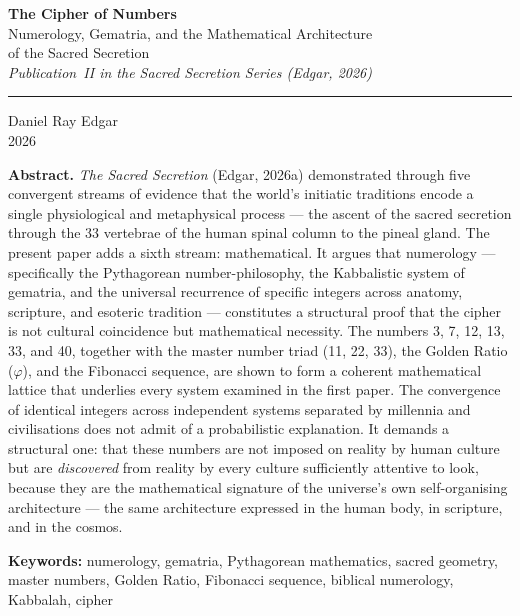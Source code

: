 \documentclass[12pt, a4paper]{article}
\begin{document}

\begin{titlepage}
  \centering
  \vspace*{2cm}

  {\LARGE\bfseries The Cipher of Numbers}\\[0.8em]
  {\large Numerology, Gematria, and the Mathematical Architecture\\
  of the Sacred Secretion}\\[0.4em]
  {\normalsize\itshape Publication~II in the Sacred Secretion Series
  (Edgar, 2026)}

  \vspace{2cm}
  \rule{0.5\linewidth}{0.5pt}
  \vspace{2cm}

  {\large Daniel Ray Edgar}\\[0.4em]
  {\normalsize 2026}

  \vfill

  \noindent\textbf{Abstract.}\quad
  \emph{The Sacred Secretion} (Edgar, 2026a) demonstrated through five
  convergent streams of evidence that the world's initiatic traditions encode
  a single physiological and metaphysical process — the ascent of the sacred
  secretion through the 33 vertebrae of the human spinal column to the pineal
  gland. The present paper adds a sixth stream: mathematical. It argues that
  numerology — specifically the Pythagorean number-philosophy, the Kabbalistic
  system of gematria, and the universal recurrence of specific integers across
  anatomy, scripture, and esoteric tradition — constitutes a structural proof
  that the cipher is not cultural coincidence but mathematical necessity. The
  numbers 3, 7, 12, 13, 33, and 40, together with the master number triad
  (11, 22, 33), the Golden Ratio ($\varphi$), and the Fibonacci sequence,
  are shown to form a coherent mathematical lattice that underlies every system
  examined in the first paper. The convergence of identical integers across
  independent systems separated by millennia and civilisations does not admit
  of a probabilistic explanation. It demands a structural one: that these
  numbers are not imposed on reality by human culture but are \emph{discovered}
  from reality by every culture sufficiently attentive to look, because they
  are the mathematical signature of the universe's own self-organising
  architecture — the same architecture expressed in the human body, in
  scripture, and in the cosmos.

  \vspace{0.5cm}
  \noindent\textbf{Keywords:} numerology, gematria, Pythagorean mathematics,
  sacred geometry, master numbers, Golden Ratio, Fibonacci sequence,
  biblical numerology, Kabbalah, cipher

\end{titlepage}
\end{document}

